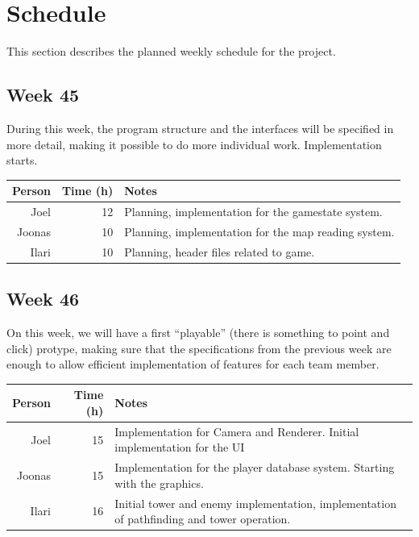 \documentclass[11pt]{article}
\begin{document}
\section{Schedule}
\label{sec-6}

This section describes the planned weekly schedule for the project.

\subsection*{Week 45}

During this week, the program structure and the interfaces will be
specified in more detail, making it possible to do more individual
work. Implementation starts.

\begin{center}
\begin{tabular}{rrp{}}
\hline
Person  & Time (h) & Notes \\
\hline
Joel & 12 & Planning, implementation for the gamestate system.\\ 
Joonas & 10 & Planning, implementation for the map reading system.\\
Ilari & 10 & Planning, header files related to game.
\end{tabular}
\end{center}

\subsection*{Week 46}

On this week, we will have a first ``playable'' (there is something to
point and click) protype, making sure that the specifications from the
previous week are enough to allow efficient implementation of features
for each team member.

\begin{center}
\begin{tabular}{rrp{}}
\hline
Person  & Time (h) & Notes \\
\hline
Joel & 15 & Implementation for Camera and Renderer. Initial implementation for the UI\\ 
Joonas & 15 & Implementation for the player database system. Starting with the graphics.\\
Ilari & 16 & Initial tower and enemy implementation, implementation of pathfinding and tower operation.
\end{tabular}
\end{center}
\end{document}
